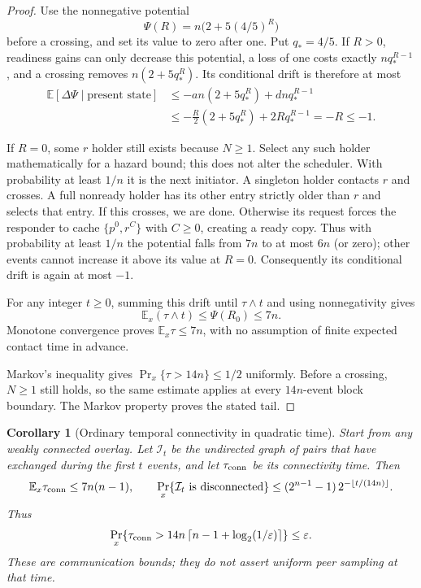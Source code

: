 \documentclass[11pt]{article}
\newtheorem{corollary}[theorem]{Corollary}
\begin{document}
\begin{proof}
Use the nonnegative potential
\[
 \Psi(R)=n\bigl(2+5(4/5)^R\bigr)
\]
before a crossing, and set its value to zero after
one. Put $q_*=4/5$. If $R>0$, readiness gains
can only decrease this potential, a loss of one
costs exactly $nq_*^{R-1}$, and a crossing removes
$n(2+5q_*^R)$. Its conditional drift is therefore
at most
\[
 \begin{split}
 \mathbb E[\Delta\Psi\mid\text{present state}]
 &\le-a n(2+5q_*^R)+d n q_*^{R-1}\\
 &\le-\frac R2(2+5q_*^R)+2R q_*^{R-1}
 =-R\le-1.
 \end{split}
\]

If $R=0$, some $r$ holder still exists because
$N\ge1$. Select any such holder mathematically
for a hazard bound; this does not alter the
scheduler. With probability at least $1/n$ it
is the next initiator. A singleton holder
contacts $r$ and crosses. A full nonready
holder has its other entry strictly older
than $r$ and selects that entry. If this
crosses, we are done. Otherwise its request
forces the responder to cache
$\{p^0,r^C\}$ with $C\ge0$, creating a ready
copy. Thus with probability at least $1/n$
the potential falls from $7n$ to at most
$6n$ (or zero); other events cannot increase
it above its value at $R=0$. Consequently
its conditional drift is again at most $-1$.

For any integer $t\ge0$, summing this drift
until $\tau\wedge t$ and using nonnegativity
gives
\[
 \mathbb E_x(\tau\wedge t)
 \le\Psi(R_0)\le7n.
\]
Monotone convergence proves
$\mathbb E_x\tau\le7n$, with no assumption
of finite expected contact time in advance.

Markov's inequality gives
$\Pr_x\{\tau>14n\}\le1/2$ uniformly.
Before a crossing, $N\ge1$ still holds,
so the same estimate applies at every
$14n$-event block boundary.
The Markov property proves the stated tail.
\end{proof}

\begin{corollary}[Ordinary temporal connectivity in quadratic time]
\label{cor:c2readytemporal}
Start from any weakly connected overlay. Let
$\mathcal I_t$ be the undirected graph of pairs
that have exchanged during the first $t$ events,
and let $\tau_{\rm conn}$ be its connectivity time.
Then
\[
 \mathbb E_x\tau_{\rm conn}\le7n(n-1),
 \qquad
 \Pr_x\{\mathcal I_t\text{ is disconnected}\}
 \le(2^{n-1}-1)\,
       2^{-\lfloor t/(14n)\rfloor}.
\]
Thus
\[
 \Pr_x\!\left\{
 \tau_{\rm conn}>
 14n\left\lceil n-1+\log_2(1/\varepsilon)\right\rceil
 \right\}\le\varepsilon.
\]
These are communication bounds; they do not
assert uniform peer sampling at that time.
\end{corollary}
\end{document}
